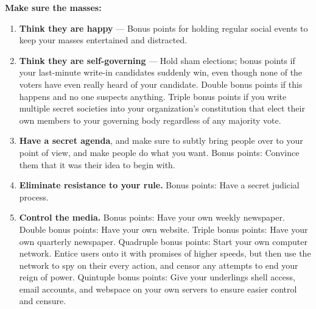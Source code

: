 \documentclass[9pt]{extarticle}
\begin{document}
\begin{minipage}[t]{.61\linewidth}
\textbf{Make sure the masses:}
\begin{enumerate}
\item \textbf{Think they are happy} — Bonus points for holding regular 
social events to keep your masses entertained and distracted.

\item \textbf{Think they are self-governing} — Hold sham elections; 
bonus points if your last-minute write-in candidates suddenly win, 
even though none of the voters have even really heard of your candidate. 
Double bonus points if this happens and no one suspects anything. 
Triple bonus points if you write multiple secret societies into your
organization's constitution that elect their own members to your governing
body regardless of any majority vote.

\item \textbf{Have a secret agenda}, and make sure to subtly bring people 
over to your point of view, and make people do what you want. Bonus points: 
Convince them that it was their idea to begin with.

\item \textbf{Eliminate resistance to your rule.} Bonus points: Have a 
secret judicial process.

\item \textbf{Control the media.} Bonus points: Have your own weekly newspaper. 
Double bonus points: Have your own website. Triple bonus points: Have your 
own quarterly newspaper. Quadruple bonus points: Start your own computer 
network. Entice users onto it with promises of higher speeds, but then use 
the network to spy on their every action, and censor any attempts to end 
your reign of power. Quintuple bonus points: Give your underlings shell 
access, email accounts, and webspace on your own servers to ensure easier
control and censure.
\end{enumerate}

\end{minipage} %
\end{document}
